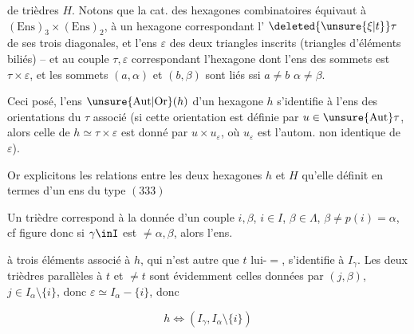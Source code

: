 
de trièdres $H$. Notons que la cat. des hexagones combinatoires équivaut à $(\mathrm{Ens})_3\times(\mathrm{Ens})_2$, à un hexagone correspondant l' $\deleted{\unsure{\xi|t}}\tau$ de ses trois diagonales, et l'ens $\varepsilon$ des deux triangles inscrits (triangles d'éléments biliés) -- et au couple $\tau,\varepsilon$ correspondant l'hexagone  dont l'ens des sommets est $\tau\times\varepsilon$,  et les sommets $(a,\alpha)$ et $(b,\beta)$ sont liés ssi $a\ne b$ $\alpha\ne\beta$.

Ceci posé, l'ens $\unsure{\mathrm{Aut}|\mathrm{Or}}(h)$ d'un hexagone $h$ s'identifie à l'ens des orientations du $\tau$ associé (si cette orientation est définie par $u\in\unsure{\mathrm{Aut}}\tau$, alors celle de $h\simeq\tau\times\varepsilon$ est donné par $u\times u_\varepsilon$, où $u_\varepsilon$ est l'autom. non identique de $\varepsilon$).

Or explicitons  les relations entre les deux hexagones $h$ et $H$ qu'elle définit en termes d'un ens du type $(333)$


Un trièdre correspond à la donnée d'un couple $i,\beta$, $i\in I$, $\beta\in\Lambda$, $\beta\ne p(i)=\alpha$, cf figure donc si $\gamma\inI$ est $\ne\alpha,\beta$, alors l'ens.


à trois éléments associé à $h$, qui n'est autre que $t$ lui-$=$, s'identifie à $I_\gamma$. Les deux trièdres  parallèles à $t$ et $\ne t$ sont évidemment celles données par $(j,\beta)$, $j\in I_\alpha\setminus\{i\}$, donc $\varepsilon\simeq I_\alpha-\{i\}$, donc

\[
h\Leftrightarrow(I_\gamma,I_\alpha\setminus\{i\})
\]

